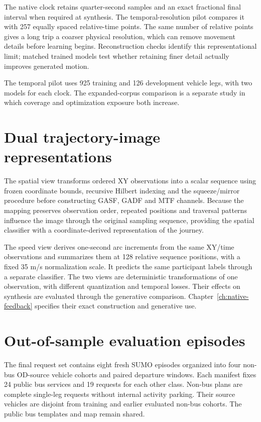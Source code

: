 The native clock retains quarter-second samples and an exact fractional final interval when required at synthesis. The temporal-resolution pilot compares it with 257 equally spaced relative-time points. The same number of relative points gives a long trip a coarser physical resolution, which can remove movement details before learning begins. Reconstruction checks identify this representational limit; matched trained models test whether retaining finer detail actually improves generated motion.

The temporal pilot uses 925 training and 126 development vehicle legs, with two models for each clock. The expanded-corpus comparison is a separate study in which coverage and optimization exposure both increase.

\section{Dual trajectory-image representations}
The spatial view transforms ordered XY observations into a scalar sequence using frozen coordinate bounds, recursive Hilbert indexing and the squeeze/mirror procedure before constructing GASF, GADF and MTF channels. Because the mapping preserves observation order, repeated positions and traversal patterns influence the image through the original sampling sequence, providing the spatial classifier with a coordinate-derived representation of the journey.

The speed view derives one-second arc increments from the same XY/time observations and summarizes them at 128 relative sequence positions, with a fixed 35 m/s normalization scale. It predicts the same participant labels through a separate classifier. The two views are deterministic transformations of one observation, with different quantization and temporal losses. Their effects on synthesis are evaluated through the generative comparison. Chapter~\ref{ch:native-feedback} specifies their exact construction and generative use.

\section{Out-of-sample evaluation episodes}
The final request set contains eight fresh SUMO episodes organized into four non-bus OD-source vehicle cohorts and paired departure windows. Each manifest fixes 24 public bus services and 19 requests for each other class. Non-bus plans are complete single-leg requests without internal activity parking. Their source vehicles are disjoint from training and earlier evaluated non-bus cohorts. The public bus templates and map remain shared.

